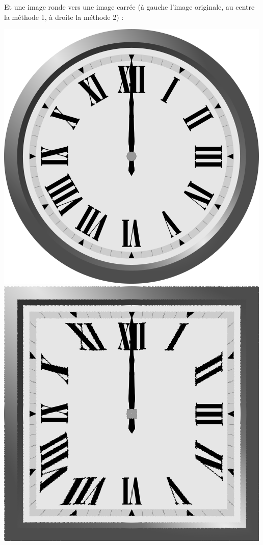 \documentclass[11pt,class=report,crop=false]{standalone}
\begin{document}
Et une image ronde vers une image carrée  (à gauche l'image originale, au centre la méthode 1, à droite la méthode 2) :
\begin{center}
	\includegraphics[scale=\myscale,scale=0.32]{figures/image_disque_avant} \qquad
	\includegraphics[scale=\myscale,scale=0.25]{figures/image_disque_apres_1} \qquad	

\end{center}
\end{document}
